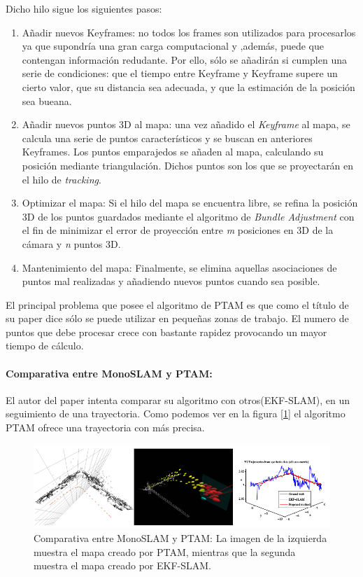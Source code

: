 \documentclass{bmvc2k}
\begin{document}
Dicho hilo sigue los siguientes pasos:
\begin{enumerate}
	\item Añadir nuevos Keyframes: no todos los frames son utilizados para procesarlos ya que supondría una gran carga computacional y ,además, puede que contengan información redudante. Por ello, sólo se añadirán si cumplen una serie de condiciones: que el tiempo entre Keyframe y Keyframe supere un cierto valor, que su distancia sea adecuada, y que la estimación de la posición sea bueana.
	\item Añadir nuevos puntos 3D al mapa: una vez añadido el \textit{Keyframe} al mapa, se calcula una serie de puntos característicos y se buscan en anteriores Keyframes. Los puntos emparajedos se añaden al mapa, calculando su posición mediante triangulación. Dichos puntos son los que se proyectarán en el hilo de \textit{tracking}.
	\item Optimizar el mapa: Si el hilo del mapa se encuentra libre, se refina la posición 3D de los puntos guardados mediante el algoritmo de \textit{Bundle Adjustment} con el fin de minimizar el error de proyección entre \textit{m} posiciones en 3D de la cámara y \textit{n} puntos 3D.
	
	
	\item Mantenimiento del mapa: Finalmente, se elimina aquellas asociaciones de puntos mal realizadas y añadiendo nuevos puntos cuando sea posible.
	
\end{enumerate}

El principal problema que posee el algoritmo de PTAM es que como el título de su paper dice sólo se puede utilizar en pequeñas zonas de trabajo. El numero de puntos que debe procesar crece con bastante rapidez provocando un mayor tiempo de cálculo.

\paragraph{Comparativa entre MonoSLAM y PTAM: } El autor del paper intenta comparar su algoritmo con otros(EKF-SLAM), en un seguimiento de una trayectoria. Como podemos ver en la figura [\ref{fig:PTAM}] el algoritmo PTAM ofrece una trayectoria con más precisa.

\begin{figure}[H]
	\centering\includegraphics[width=12cm]{images/PTAM.png}
	\caption{Comparativa entre MonoSLAM y PTAM: La imagen de la izquierda muestra el mapa creado por PTAM, mientras que la segunda muestra el mapa creado por EKF-SLAM.}
	\label{fig:PTAM}
\end{figure}
\end{document}
